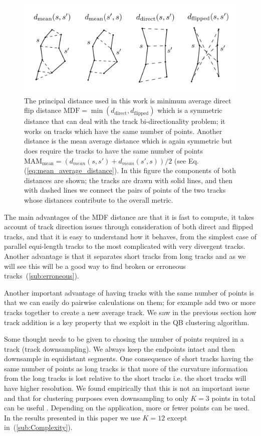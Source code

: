 \documentclass[preprint,authoryear,a4paper,10pt,onecolumn]{elsarticle}
\begin{document}
\begin{figure}
\includegraphics[scale=0.5]{distances2}
\centering{}\caption{The principal distance used in this work is minimum
  average direct flip distance
  $\textrm{MDF}=\min(d_{\textrm{direct}},d_{\textrm{flipped}})$ which is
  a symmetric distance that can deal with the track bi-directionality
  problem; it works on tracks which have the same number of points.
  Another distance is the mean average distance which is again symmetric
  but does require the tracks to have the same number of points
  $\textrm{MAM}_{\textrm{mean}}=(d_{mean}(s,s')+d_{mean}(s',s))/2$ (see
  Eq. (\ref{eq:mean_average_distance}).  In this figure the components
  of both distances are shown; the tracks are drawn with solid lines,
  and then with dashed lines we connect the pairs of points of the two
  tracks whose distances contribute to the overall
  metric.\label{Flo:Distances_used}}
\end{figure}

The main advantages of the MDF distance are that it is fast to compute,
it takes account of track direction issues through consideration of both
direct and flipped tracks, and that it is easy to understand how it
behaves, from the simplest case of parallel equi-length tracks to the
most complicated with very divergent tracks. Another advantage is that
it separates short tracks from long tracks and as we will see this will
be a good way to find broken or erroneous
tracks~(\ref{sub:erroneous}). 

Another important advantage of having tracks with the same number of
points is that we can easily do pairwise calculations on them; for
example add two or more tracks together to create a new average
track. We saw in the previous section how track addition is a key
property that we exploit in the QB clustering algorithm.

Some thought needs to be given to chosing the number of points required
in a track (track downsampling). We always keep the endpoints intact and
then downsample in equidistant segments. One consequence of short tracks
having the same number of points as long tracks is that more of the
curvature information from the long tracks is lost relative to the short
tracks i.e. the short tracks will have higher resolution.  We found
empirically that this is not an important issue and that for clustering
purposes even downsampling to only $K=3$ points in total can be useful
\citep{EGMB10}. Depending on the application, more or fewer points can
be used. In the results presented in this paper we use $K=12$ except
in~(\ref{sub:Complexity}).
\end{document}
